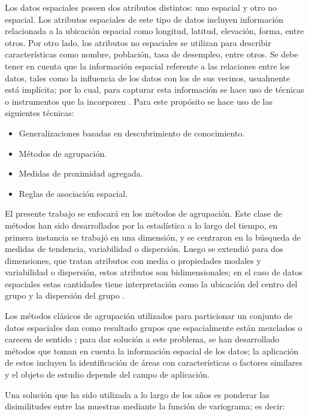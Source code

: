 \documentclass[
]{book}
\begin{document}
Los datos espaciales poseen dos atributos distintos: uno espacial y otro no espacial. Los atributos espaciales de este tipo de datos incluyen información relacionada a la ubicación espacial como longitud, latitud, elevación, forma, entre otros. Por otro lado, los atributos no espaciales se utilizan para describir características como nombre, población, tasa de desempleo, entre otros. Se debe tener en cuenta que la información espacial referente a las relaciones entre los datos, tales como la influencia de los datos con los de sus vecinos, usualmente está implícita; por lo cual, para capturar esta información se hace uso de técnicas o instrumentos que la incorporen \citep{chuek}. Para este propósito se hace uso de las siguientes técnicas:

\begin{itemize}
\item
  Generalizaciones basadas en descubrimiento de conocimiento.
\item
  Métodos de agrupación.
\item
  Medidas de proximidad agregada.
\item
  Reglas de asociación espacial.
\end{itemize}

El presente trabajo se enfocará en los métodos de agrupación. Este clase de métodos han sido desarrollados por la estadística a lo largo del tiempo, en primera instancia se trabajó en una dimensión, y se centraron en la búsqueda de medidas de tendencia, variabilidad o dispersión. Luego se extendió para dos dimensiones, que tratan atributos con media o propiedades modales y variabilidad o dispersión, estos atributos son bidimensionales; en el caso de datos espaciales estas cantidades tiene interpretación como la ubicación del centro del grupo y la dispersión del grupo \citep{andrew}.

Los métodos clásicos de agrupación utilizados para particionar un conjunto de datos espaciales dan como resultado grupos que espacialmente están mezclados o carecen de sentido \citep{ambrosi}; para dar solución a este problema, se han desarrollado métodos que toman en cuenta la información espacial de los datos; la aplicación de estos incluyen la identificación de áreas con características o factores similares y el objeto de estudio depende del campo de aplicación.

Una solución que ha sido utilizada a lo largo de los años es ponderar las disimilitudes entre las muestras mediante la función de variograma; es decir:
\end{document}
